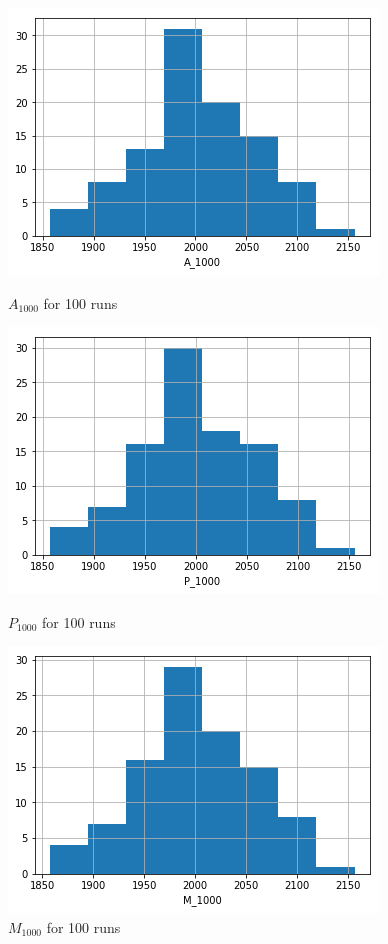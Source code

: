 \begin{figure}[H]
  \includegraphics[width=\linewidth]{figures/task1-A.png}
  \caption{$A_{1000}$ for 100 runs}\label{fig:task1A}
\endminipage\hfill
{}
  \includegraphics[width=\linewidth]{figures/task1-P.png}
  \caption{$P_{1000}$ for 100 runs}\label{fig:task1P}
\endminipage\hfill
{}%
  \includegraphics[width=\linewidth]{figures/task1-M.png}
  \caption{$M_{1000}$ for 100 runs}\label{fig:task1M}
\endminipage
\end{figure}



